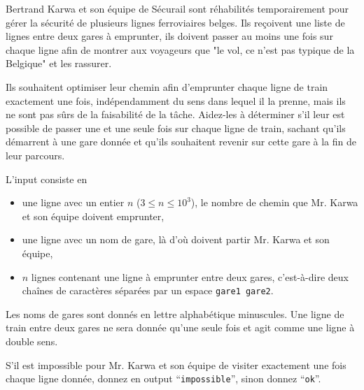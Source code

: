 \problemname{\problemyamlname}

Bertrand Karwa et son équipe de Sécurail sont réhabilités temporairement pour gérer la sécurité de plusieurs
lignes ferroviaires belges. Ils reçoivent une liste de lignes entre deux gares à emprunter, ils doivent passer au moins
une fois sur chaque ligne afin de montrer aux voyageurs que "le vol, ce n'est pas typique de la Belgique" et les rassurer.

Ils souhaitent optimiser leur chemin afin d'emprunter chaque ligne de train exactement une fois, indépendamment du sens dans lequel il la prenne, mais ils ne sont pas sûrs
de la faisabilité de la tâche. Aidez-les à déterminer s'il leur est possible de passer une et une seule fois sur chaque ligne de train, sachant qu'ils démarrent à une
gare donnée et qu'ils souhaitent revenir sur cette gare à la fin de leur parcours.

\begin{Input}
    L'input consiste en
    \begin{itemize}
        \item une ligne avec un entier $n$ ($3\leq n\leq 10^3$), le nombre de chemin que Mr. Karwa et son équipe doivent emprunter,
        \item une ligne avec un nom de gare, là d'où doivent partir Mr. Karwa et son équipe,
        \item $n$ lignes contenant une ligne à emprunter entre deux gares, c'est-à-dire deux chaînes de caractères séparées par un espace \texttt{gare1 gare2}.
    \end{itemize}
    Les noms de gares sont donnés en lettre alphabétique minuscules. Une ligne de train entre deux gares ne sera donnée qu'une seule fois et agit comme une ligne à double sens.
\end{Input}

\begin{Output}
    S'il est impossible pour Mr. Karwa et son équipe de visiter exactement une fois chaque ligne donnée, donnez en output ``\texttt{impossible}'', sinon donnez ``\texttt{ok}''.
\end{Output}
